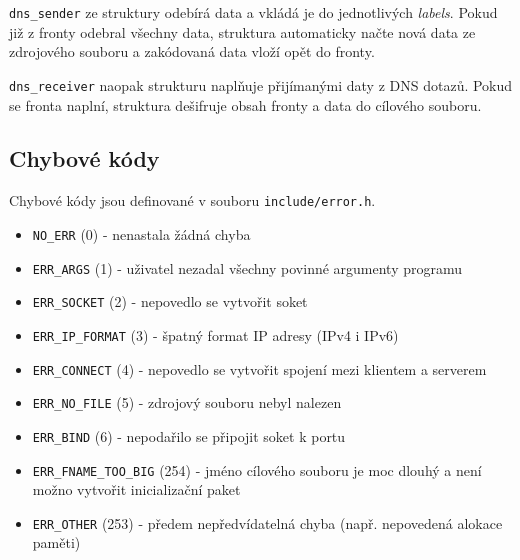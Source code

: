 \documentclass[a4paper,11pt]{article}
\begin{document}
    \verb|dns_sender| ze struktury
    odebírá data a vkládá je do jednotlivých \emph{labels}. Pokud již z fronty odebral všechny data, struktura
    automaticky načte nová data ze zdrojového souboru a zakódovaná data vloží opět do fronty.

    \verb|dns_receiver| naopak strukturu naplňuje přijímanými daty z DNS dotazů. Pokud se fronta naplní, struktura
    dešifruje obsah fronty a data  do cílového souboru.

    \subsection{Chybové kódy}
    Chybové kódy jsou definované v souboru \verb|include/error.h|.
    \begin{itemize}
        \setlength\itemsep{1pt}
        \item \verb|NO_ERR|            (0) \-- nenastala žádná chyba
        \item \verb|ERR_ARGS|          (1) \-- uživatel nezadal všechny povinné argumenty programu
        \item \verb|ERR_SOCKET|        (2) \-- nepovedlo se vytvořit soket
        \item \verb|ERR_IP_FORMAT|     (3) \-- špatný format IP adresy (IPv4 i IPv6)
        \item \verb|ERR_CONNECT|       (4) \-- nepovedlo se vytvořit spojení mezi klientem a serverem
        \item \verb|ERR_NO_FILE|       (5) \-- zdrojový souboru nebyl nalezen
        \item \verb|ERR_BIND|          (6) \-- nepodařilo se připojit soket k portu
        \item \verb|ERR_FNAME_TOO_BIG| (254) \-- jméno cílového souboru je moc dlouhý a není možno vytvořit inicializační paket
    \item \verb|ERR_OTHER|         (253) \-- předem nepředvídatelná chyba (např. nepovedená alokace paměti)
    \end{itemize}
\end{document}
